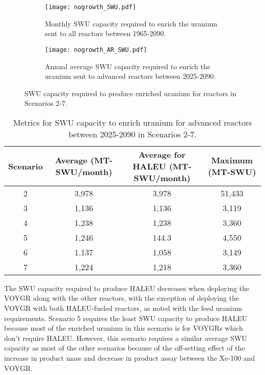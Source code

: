 \begin{figure}[h!]
    \centering
    \begin{subfigure}[b]{0.45\textwidth}
        \centering
        \texttt{[image: nogrowth\_SWU.pdf]}
        \caption{Monthly \gls{SWU} capacity required to enrich the  
        uranium sent to all reactors between 1965-2090.}
        \label{fig:nogrowth_all_SWU}
    \end{subfigure}
    \hfill
    \begin{subfigure}[b]{0.45\textwidth}
        \centering
        \texttt{[image: nogrowth\_AR\_SWU.pdf]}
        \caption{Annual average \gls{SWU} capacity required to enrich 
        the uranium sent to advanced reactors between 2025-2090.}
        \label{fig:nogrowth_AR_SWU}
    \end{subfigure}
       \caption{\gls{SWU} capacity required to produce enriched uranium 
       for reactors in Scenarios 2-7.}
       \label{fig:nogrowth_swu}
\end{figure}

\begin{table}[h!]
    \centering 
    \caption{Metrics for \gls{SWU} capacity to enrich uranium for 
    advanced reactors between 2025-2090 in Scenarios 2-7.}
    \label{tab:nogrowth_swu}
    \begin{tabular}{c c c c}
        \hline
        Scenario & Average  (MT-SWU/month) & Average
        for \gls{HALEU} (MT-SWU/month) & Maximum (MT-SWU)\\\hline
        2 & 3,978 & 3,978 & 51,433 \\
        3 & 1,136 & 1,136 & 3,119\\
        4 & 1,238 & 1,238 & 3,360\\
        5 & 1,246 & 144.3 & 4,550 \\
        6 & 1,137 & 1,058 & 3,149\\
        7 & 1,224 & 1,218 & 3,360\\
        \hline
    \end{tabular}
\end{table}

The \gls{SWU} capacity required to produce \gls{HALEU} decreases when 
deploying the VOYGR along with the other reactors, with the exception 
of deploying the VOYGR with both \gls{HALEU}-fueled reactors, as noted 
with the feed uranium requirements. 
Scenario 5 requires the least \gls{SWU} capacity to produce 
\gls{HALEU} because most of the enriched uranium in this 
scenario is for VOYGRs which don't require \gls{HALEU}. However, this 
scenario requires a similar average \gls{SWU} capacity as most of the other 
scenarios because of the off-setting effect of the increase in product mass 
and decrease in product assay between the Xe-100 and VOYGR. 

